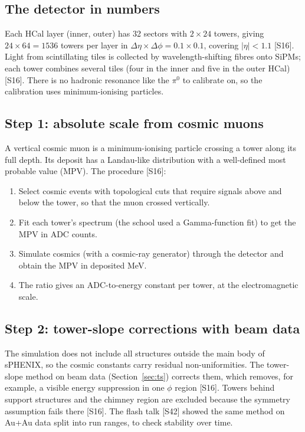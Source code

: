 \documentclass[11pt,letterpaper]{article}
\begin{document}
\subsection{The detector in numbers}
Each HCal layer (inner, outer) has 32 sectors with $2\times24$ towers, giving $24\times64=1536$ towers per layer in $\Delta\eta\times\Delta\phi=0.1\times0.1$, covering $|\eta|<1.1$ [S16].
Light from scintillating tiles is collected by wavelength-shifting fibres onto SiPMs; each tower combines several tiles (four in the inner and five in the outer HCal) [S16].
There is no hadronic resonance like the $\pi^0$ to calibrate on, so the calibration uses minimum-ionising particles.

\subsection{Step 1: absolute scale from cosmic muons}
A vertical cosmic muon is a minimum-ionising particle crossing a tower along its full depth. Its deposit has a Landau-like distribution with a well-defined most probable value (MPV).
The procedure [S16]:
\begin{enumerate}
\item Select cosmic events with topological cuts that require signals above and below the tower, so that the muon crossed vertically.
\item Fit each tower's spectrum (the school used a Gamma-function fit) to get the MPV in ADC counts.
\item Simulate cosmics (with a cosmic-ray generator) through the detector and obtain the MPV in deposited MeV.
\item The ratio gives an ADC-to-energy constant per tower, at the electromagnetic scale.
\end{enumerate}

\subsection{Step 2: tower-slope corrections with beam data}
The simulation does not include all structures outside the main body of sPHENIX, so the cosmic constants carry residual non-uniformities.
The tower-slope method on beam data (Section~\ref{sec:ts}) corrects them, which removes, for example, a visible energy suppression in one $\phi$ region [S16].
Towers behind support structures and the chimney region are excluded because the symmetry assumption fails there [S16].
The flash talk [S42] showed the same method on Au+Au data split into run ranges, to check stability over time.
\end{document}
